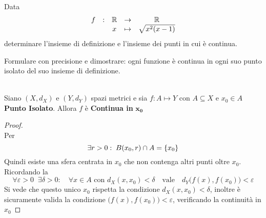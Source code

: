 \begin{exercise}
	Data
	$$\begin{array}{ccccc} {f} & : & {\mathbb{R}} & \to & {\mathbb{R}} \\ & & {x} & \mapsto & {\sqrt{x^2(x-1)}} \\ \end{array}$$
	determinare l'insieme di definizione e l'insieme dei punti in cui è continua.
\end{exercise}
\begin{exercise}
	\label{ex:f_cont_in_pto_isol}
	Formulare con precisione e dimostrare: ogni funzione è continua in ogni suo punto isolato del suo insieme di definizione.
	\begin{solution}\hfill\\
		Siano $(X,d_X)$ e $(Y,d_Y)$ spazi metrici e sia $f: A \mapsto Y$ con $A \subseteq X$ e $x_0 \in A$ \textbf{Punto Isolato}. Allora $f$ è \textbf{Continua in} $\boldsymbol{x_0}$
		\begin{proof}\hfill\\
			Per 
			$$\exists r > 0:\; B(x_0, r) \cap A = \left\{x_0\right\}$$
			Quindi esiste una sfera centrata in $x_0$ che non contenga altri punti oltre $x_0$.
			Ricordando la 
			$$\forall \varepsilon > 0\;\;\exists \delta > 0:\quad \forall x \in A \text{ con } d_X(x,x_0)<\delta \quad \text{vale} \quad d_Y \bigl(f(x),f(x_0)\bigr) < \varepsilon$$
			Si vede che questo unico $x_0$ rispetta la condizione $d_X(x,x_0)<\delta$, inoltre è sicuramente valida la condizione $\bigl(f(x),f(x_0)\bigr) < \varepsilon$, verificando la continuità in $x_0$
		\end{proof}
	\end{solution}
\end{exercise}

